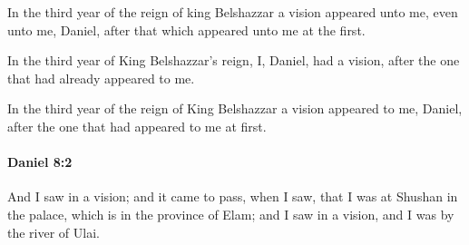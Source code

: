 			\begin{versebox}
					\item[BHS] 
					\item[LXX] 
					\item[ASV] In the third year of the reign of king Belshazzar a vision appeared unto me, even unto me, Daniel, after that which appeared unto me at the first.
					\item[NIV] In the third year of King Belshazzar’s reign, I, Daniel, had a vision, after the one that had already appeared to me.
					\item[NRSV] In the third year of the reign of King Belshazzar a vision appeared to me, Daniel, after the one that had appeared to me at first.
			\end{versebox}

		\paragraph{Daniel 8:2} %
			\label{DANIEL-8-2}

			And I saw in a vision; and it came to pass, when I saw, that I was at Shushan in the palace, which is in the province of Elam; and I saw in a vision, and I was by the river of Ulai.

